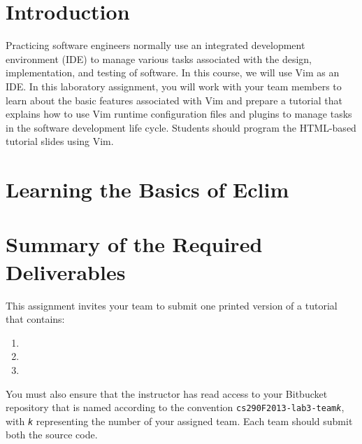 

\usepackage[compact]{titlesec}



\section*{Introduction}

Practicing software engineers normally use an integrated development environment (IDE) to manage various tasks
associated with the design, implementation, and testing of software. In this course, we will use Vim as an IDE.  In this
laboratory assignment, you will work with your team members to learn about the basic features associated with Vim and
prepare a tutorial that explains how to use Vim runtime configuration files and plugins to manage tasks in the software
development life cycle.  Students should program the HTML-based tutorial slides using Vim.

\section*{Learning the Basics of Eclim}

\section*{Summary of the Required Deliverables}

This assignment invites your team to submit one printed version of a tutorial that contains:

\begin{enumerate}
	
	\item 
	\item 
	\item 

\end{enumerate}

You must also ensure that the instructor has read access to your Bitbucket repository that is named according to the
convention {\tt cs290F2013-lab3-team{\em k}}, with {\tt {\em k}} representing the number of your assigned team. 
Each team should submit both the source code.


